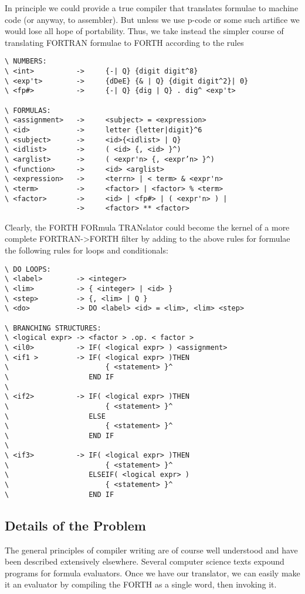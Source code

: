 In principle we could provide a true compiler that translates formulae to machine code (or anyway, to assembler). But unless we use p-code or some such artifice we would lose all hope of portability. Thus, we take instead the simpler course of translating FORTRAN formulae to FORTH according to the rules

\begin{verbatim}
\ NUMBERS:
\ <int>          ->     {-| Q} {digit digit^8}
\ <exp't>        ->     {dDeE} {& | Q} {digit digit^2}| 0}
\ <fp#>          ->     {-| Q} {dig | Q} . dig^ <exp't>

\ FORMULAS:
\ <assignment>   ->     <subject> = <expression>
\ <id>           ->     letter {letter|digit}^6
\ <subject>      ->     <id>{<idlist> | Q}
\ <idlist>       ->     ( <id> {, <id> }^)
\ <arglist>      ->     ( <expr'n> {, <expr’n> }^)
\ <function>     ->     <id> <arglist>
\ <expression>   ->     <terrn> | < term> & <expr'n>
\ <term>         ->     <factor> | <factor> % <term>
\ <factor>       ->     <id> | <fp#> | ( <expr'n> ) |
                 ->     <factor> ** <factor>
\end{verbatim}

Clearly, the FORTH FORmula TRANslator could become the kernel of a more complete FORTRAN->FORTH filter by adding to the above rules for formulae the following rules for loops and conditionals:

\begin{verbatim}
\ DO LOOPS:
\ <label>        -> <integer>
\ <lim>          -> { <integer> | <id> }
\ <step>         -> {, <lim> | Q }
\ <do>           -> DO <label> <id> = <lim>, <lim> <step>

\ BRANCHING STRUCTURES:
\ <logical expr> -> <factor > .op. < factor >
\ <il0>          -> IF( <logical expr> ) <assignment>
\ <if1 >         -> IF( <logical expr> )THEN
\                       { <statement> }^
\                   END IF
\
\ <if2>          -> IF( <logical expr> )THEN
\                       { <statement> }^
\                   ELSE
\                       { <statement> }^
\                   END IF
\
\ <if3>          -> IF( <logical expr> )THEN
\                       { <statement> }^
\                   ELSEIF( <logical expr> )
\                       { <statement> }^
\                   END IF
\end{verbatim}

\subsection{Details of the Problem}
The general principles of compiler writing are of course well understood and have been described extensively elsewhere. Several computer science texts expound programs for formula evaluators. Once we have our translator, we can easily make it an evaluator by compiling the FORTH as a single word, then invoking it.

